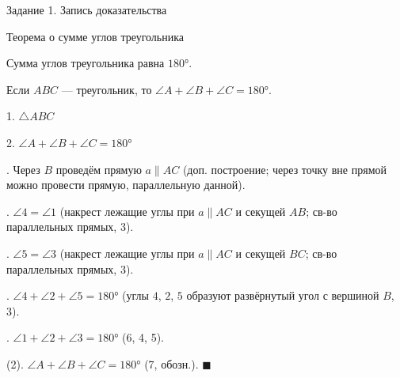 
\newcommand{\gr}{\text{°}}
\newcommand{\ug}{\angle}
\newcommand{\harc}[4]{\draw[line width=0.6pt, decorate, decoration={random steps, segment length=5pt, amplitude=0.3pt}] ($(#1)+(#2:#4)$) arc (#2:#3:#4);}
\shapka
{\fontsize{20pt}{10mm}\selectfont Задание 1. Запись доказательства}\par
Теорема о сумме углов треугольника \par\vspace{2mm}
\par
Сумма углов треугольника равна $180\gr$.\par
{}\par
Если $ABC$ --- треугольник, то $\ug A+\ug B+\ug C=180\gr$.\par\vspace{1mm}
\noindent\begin{minipage}[t]{0.5\textwidth}
\par
1. $\triangle ABC$\par
{}\par
2. $\ug A+\ug B+\ug C=180\gr$\par
\nb{обозн.: $\ug 1=\ug A$, $\ug 2=\ug B$,}\par\nb{\hspace*{12mm}$\ug 3=\ug C$}
\end{minipage}\hfill
\begin{minipage}[t]{0.47\textwidth}\vspace{-6mm}
\end{minipage}\par\vspace{2mm}
\par
\def\st{\par\hangindent=7mm\noindent}
\st 3. Через $B$ проведём прямую $a\parallel AC$ (доп. построение; через точку вне прямой можно провести прямую, параллельную данной).
\st 4. $\ug 4=\ug 1$ (накрест лежащие углы при $a\parallel AC$ и секущей $AB$; св-во параллельных прямых, 3).
\st 5. $\ug 5=\ug 3$ (накрест лежащие углы при $a\parallel AC$ и секущей $BC$; св-во параллельных прямых, 3).
\st 6. $\ug 4+\ug 2+\ug 5=180\gr$ (углы $4$, $2$, $5$ образуют развёрнутый угол с вершиной $B$, 3).
\st 7. $\ug 1+\ug 2+\ug 3=180\gr$ (6, 4, 5).
\st 8 (2). $\ug A+\ug B+\ug C=180\gr$ (7, обозн.). $\blacksquare$\par


